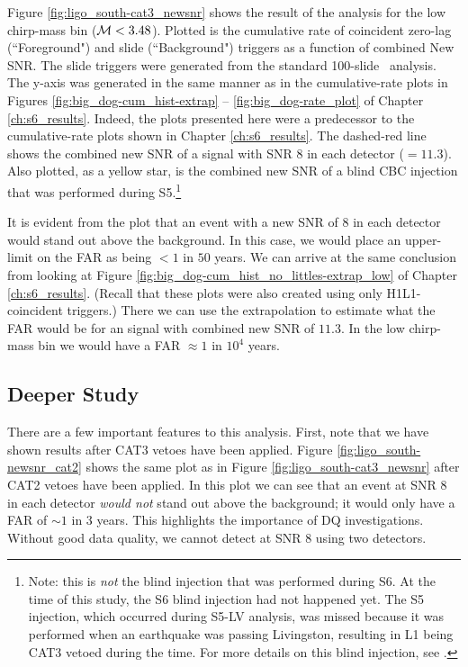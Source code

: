 Figure \ref{fig:ligo_south-cat3_newsnr} shows the result of the analysis for
the low chirp-mass bin ($\mathcal{M} < 3.48$). Plotted is the cumulative rate of
coincident zero-lag (``Foreground") and slide (``Background") triggers as a
function of combined New \ac{SNR}. The slide triggers were generated from the
standard 100-slide \ihope~analysis. The y-axis was generated in the same manner
as in the cumulative-rate plots in Figures \ref{fig:big_dog-cum_hist-extrap} --
\ref{fig:big_dog-rate_plot} of Chapter \ref{ch:s6_results}. Indeed, the plots
presented here were a predecessor to the cumulative-rate plots shown in Chapter
\ref{ch:s6_results}. The dashed-red line shows the combined new \ac{SNR} of a
signal with \ac{SNR} $8$ in each detector ($= 11.3$). Also plotted, as a yellow
star, is the combined new \ac{SNR} of a blind \ac{CBC} injection that was
performed during \ac{S5}.\footnote{Note: this is \emph{not} the blind injection
that was performed during \ac{S6}. At the time of this study, the \ac{S6} blind
injection had not happened yet. The \ac{S5} injection, which occurred during
\ac{S5}-LV analysis, was missed because it was performed when an earthquake was
passing Livingston, resulting in L1 being CAT3 vetoed during the time. For more
details on this blind injection, see \cite{S5LowMassLV}.}

It is evident from the plot that an event with a new \ac{SNR} of $8$ in each
detector would stand out above the background. In this case, we would place an
upper-limit on the \ac{FAR} as being $< 1$ in $50$ years. We can arrive at the
same conclusion from looking at Figure
\ref{fig:big_dog-cum_hist_no_littles-extrap_low} of Chapter
\ref{ch:s6_results}. (Recall that these plots were also created using only
H1L1-coincident triggers.) There we can use the extrapolation to estimate what
the \ac{FAR} would be for an signal with combined new \ac{SNR} of $11.3$. In
the low chirp-mass bin we would have a \ac{FAR} $\approx 1$ in $10^4$ years. 

\subsection{Deeper Study}

There are a few important features to this analysis. First, note that we have
shown results after CAT3 vetoes have been applied. Figure
\ref{fig:ligo_south-newsnr_cat2} shows the same plot as in Figure
\ref{fig:ligo_south-cat3_newsnr} after CAT2 vetoes have been applied. In this
plot we can see that an event at \ac{SNR} $8$ in each detector \emph{would not}
stand out above the background; it would only have a \ac{FAR} of $\sim1$ in $3$
years. This highlights the importance of \ac{DQ} investigations. Without good
data quality, we cannot detect at \ac{SNR} $8$ using two detectors.

